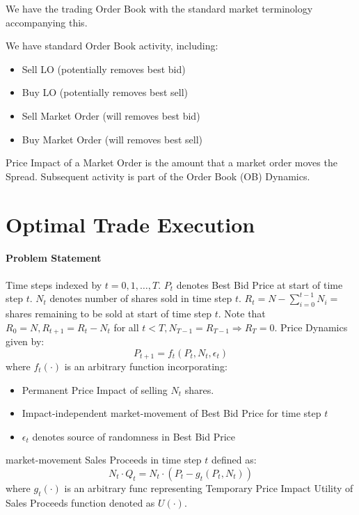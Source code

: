\documentclass[11pt]{article}
\begin{document}
\maketitle
\thispagestyle{first}
We have the trading Order Book with the standard market terminology accompanying this. 

We have standard Order Book activity, including:
\begin{itemize}
    \item Sell LO (potentially removes best bid)
    \item Buy LO (potentially removes best sell)
    \item Sell Market Order (will removes best bid)
    \item Buy Market Order (will removes best sell)
\end{itemize}

Price Impact of a Market Order is the amount that a market order moves the Spread. Subsequent activity is part of the Order Book (OB) Dynamics.

\section{Optimal Trade Execution}
\paragraph*{Problem Statement}
Time steps indexed by $t=0,1, \ldots, T$.
$P_t$ denotes Best Bid Price at start of time step $t$.
$N_t$ denotes number of shares sold in time step $t$.
$R_t=N-\sum_{i=0}^{t-1} N_i=$ shares remaining to be sold at start of time step $t$.
Note that $R_0=N, R_{t+1}=R_t-N_t$ for all $t<T, N_{T-1}=R_{T-1} \Rightarrow R_T=0$.
Price Dynamics given by:
$$
P_{t+1}=f_t\left(P_t, N_t, \epsilon_t\right)
$$
where $f_t(\cdot)$ is an arbitrary function incorporating:
\begin{itemize}
    \item Permanent Price Impact of selling $N_t$ shares.
    \item Impact-independent market-movement of Best Bid Price for time step $t$
    \item $\epsilon_t$ denotes source of randomness in Best Bid Price 
\end{itemize}market-movement
Sales Proceeds in time step $t$ defined as:
$$
N_t \cdot Q_t=N_t \cdot\left(P_t-g_t\left(P_t, N_t\right)\right)
$$
where $g_t(\cdot)$ is an arbitrary func representing Temporary Price Impact Utility of Sales Proceeds function denoted as $U(\cdot)$.
\end{document}
